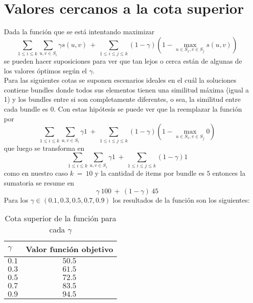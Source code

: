 \section{Valores cercanos a la cota superior}\label{conc:valoresOptimos}
Dada la función que se está intentando maximizar $$\displaystyle\sum_{1 \leq i \leq k} \displaystyle\sum_{u,v \in S_{i}} \gamma s(u,v)\ +\ \displaystyle\sum_{1 \leq i \leq j \leq k} (1-\gamma) (1 - \displaystyle\max_{u \in S_{1}, v \in S_{j}} s(u,v))$$ se pueden hacer suposiciones para ver que tan lejos o cerca están de algunas de los valores óptimos según el $\gamma$.\\
Para las siguientes cotas se suponen escenarios ideales en el cuál la soluciones contiene bundles donde todos sus elementos tienen una similitud máxima (igual a 1) y los bundles entre si son completamente diferentes, o sea, la similitud entre cada bundle es 0. Con estas hipótesis se puede ver que la reemplazar la función por $$\displaystyle\sum_{1 \leq i \leq k} \displaystyle\sum_{u,v \in S_{i}} \gamma 1\ +\ \displaystyle\sum_{1 \leq i \leq j \leq k} (1-\gamma) (1 - \displaystyle\max_{u \in S_{1}, v \in S_{j}} 0)$$ que luego se transforma en $$\displaystyle\sum_{1 \leq i \leq k} \displaystyle\sum_{u,v \in S_{i}} \gamma 1\ +\ \displaystyle\sum_{1 \leq i \leq j \leq k} (1-\gamma) 1$$ como en nuestro caso $k\ =\ 10$ y la cantidad de items por bundle es $5$ entonces la sumatoria se resume en $$\displaystyle\gamma\ 100\ +\ (1-\gamma)\ 45$$
Para los $\gamma \in (0.1, 0.3, 0.5, 0.7, 0.9)$ los resultados de la función son los siguientes:\\
\begin{table}[H]
  \centering
  \resizebox{0.5\textwidth}{!} {
    \begin{tabular}{|lc|}
    \hline
    $\gamma$ & Valor función objetivo \\
    \hline
    $0.1$  & $50.5$ \\
    $0.3$  & $61.5$ \\
    $0.5$  & $72.5$ \\
    $0.7$  & $83.5$ \\
    $0.9$  & $94.5$ \\
    \hline
    \end{tabular}
  }
    \caption {Cota superior de la función para cada $\gamma$}
\end{table}
